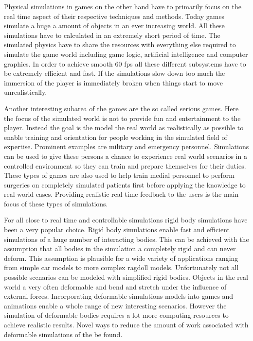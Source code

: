 Physical simulations in games on the other hand have to primarily focus on the real time aspect of their respective techniques and methods. Today games simulate a huge a amount of objects in an ever increasing world. All these simulations have to calculated in an extremely short period of time. The simulated physics have to share the resources with everything else required to simulate the game world including game logic, artificial intelligence and computer graphics. In order to achieve smooth 60 fps all these different subsystems have to be extremely efficient and fast. If the simulations slow down too much the immersion of the player is immediately broken when things start to move unrealistically.

Another interesting subarea of the games are the so called serious games. Here the focus of the simulated world is not to provide fun and entertainment to the player. Instead the goal is the model the real world as realistically as possible to enable training and orientation for people working in the simulated field of expertise. Prominent examples are military and emergency personnel. Simulations can be used to give these persons a chance to experience real world scenarios in a controlled environment so they can train and prepare themselves for their duties. These types of games are also used to help train medial personnel to perform surgeries on completely simulated patients first before applying the knowledge to real world cases. Providing realistic real time feedback to the users is the main focus of these types of simulations.

For all close to real time and controllable simulations rigid body simulations have been a very popular choice. Rigid body simulations enable fast and efficient simulations of a huge number of interacting bodies. This can be achieved with the assumption that all bodies in the simulation a completely rigid and can never deform. This assumption is plausible for a wide variety of applications ranging from simple car models to more complex ragdoll models. Unfortunately not all possible scenarios can be modeled with simplified rigid bodies. Objects in the real world a very often deformable and bend and stretch under the influence of external forces. Incorporating deformable simulations models into games and animations enable a whole range of new interesting scenarios. However the simulation of deformable bodies requires a lot more computing resources to achieve realistic results. Novel ways to reduce the amount of work associated with deformable simulations of the be found.

